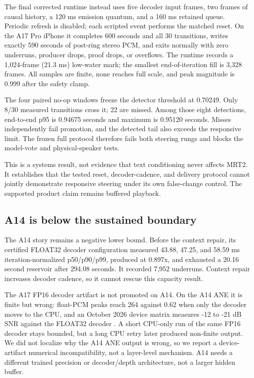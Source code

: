 \documentclass[10pt]{article}
\begin{document}
The final corrected runtime instead uses five decoder input frames, two frames of causal history, a 120 ms emission quantum, and a 160 ms retained queue. Periodic refresh is disabled; each scripted event performs the matched reset. On the A17 Pro iPhone it completes 600 seconds and all 30 transitions, writes exactly 590 seconds of post-ring stereo PCM, and exits normally with zero underruns, producer drops, proof drops, or overflows. The runtime records a 1,024-frame (21.3 ms) low-water mark; the smallest end-of-iteration fill is 3,328 frames. All samples are finite, none reaches full scale, and peak magnitude is 0.999 after the safety clamp.

The four paired no-op windows freeze the detector threshold at 0.70249. Only 8/30 measured transitions cross it; 22 are missed. Among those eight detections, end-to-end p95 is 0.94675 seconds and maximum is 0.95120 seconds. Misses independently fail promotion, and the detected tail also exceeds the responsive limit. The frozen full protocol therefore fails both steering rungs and blocks the model-vote and physical-speaker tests.

This is a systems result, not evidence that text conditioning never affects MRT2. It establishes that the tested reset, decoder-cadence, and delivery protocol cannot jointly demonstrate responsive steering under its own false-change control. The supported product claim remains buffered playback.

\subsection{A14 is below the sustained boundary}
The A14 story remains a negative lower bound. Before the context repair, its certified FLOAT32 decoder configuration measured 43.88, 47.25, and 58.59 ms iteration-normalized p50/p90/p99, produced at 0.897x, and exhausted a 20.16 second reservoir after 294.08 seconds. It recorded 7,952 underruns. Context repair increases decoder cadence, so it cannot rescue this capacity result.

The A17 FP16 decoder artifact is not promoted on A14. On the A14 ANE it is finite but wrong: float-PCM peaks reach 264 against 0.62 when only the decoder moves to the CPU, and an October 2026 device matrix measures -12 to -21 dB SNR against the FLOAT32 decoder \citep{surgical-inference}. A short CPU-only run of the same FP16 decoder stays bounded, but a long CPU retry later produced non-finite output. We did not localize why the A14 ANE output is wrong, so we report a device-artifact numerical incompatibility, not a layer-level mechanism. A14 needs a different trained precision or decoder/depth architecture, not a larger hidden buffer.
\end{document}
